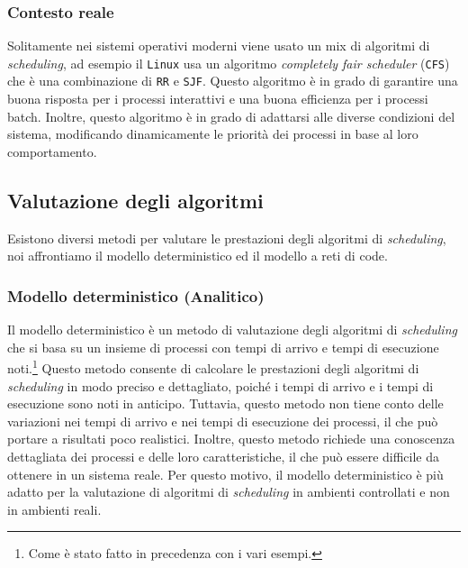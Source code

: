            \subsubsection{Contesto reale}
                Solitamente nei sistemi operativi moderni viene usato un mix di algoritmi di \textit{scheduling}, ad esempio il \texttt{Linux} usa un algoritmo \textit{completely fair scheduler} (\texttt{CFS}) che è una combinazione di \texttt{RR} e \texttt{SJF}. Questo algoritmo è in grado di garantire una buona risposta per i processi interattivi e una buona efficienza per i processi batch. Inoltre, questo algoritmo è in grado di adattarsi alle diverse condizioni del sistema, modificando dinamicamente le priorità dei processi in base al loro comportamento.
        \subsection{Valutazione degli algoritmi}
            Esistono diversi metodi per valutare le prestazioni degli algoritmi di \textit{scheduling}, noi affrontiamo il modello deterministico ed il modello a reti di code.\
            \subsubsection{Modello deterministico (Analitico)}
                Il modello deterministico è un metodo di valutazione degli algoritmi di \textit{scheduling} che si basa su un insieme di processi con tempi di arrivo e tempi di esecuzione noti.\footnote{Come è stato fatto in precedenza con i vari esempi.} Questo metodo consente di calcolare le prestazioni degli algoritmi di \textit{scheduling} in modo preciso e dettagliato, poiché i tempi di arrivo e i tempi di esecuzione sono noti in anticipo. Tuttavia, questo metodo non tiene conto delle variazioni nei tempi di arrivo e nei tempi di esecuzione dei processi, il che può portare a risultati poco realistici. Inoltre, questo metodo richiede una conoscenza dettagliata dei processi e delle loro caratteristiche, il che può essere difficile da ottenere in un sistema reale. Per questo motivo, il modello deterministico è più adatto per la valutazione di algoritmi di \textit{scheduling} in ambienti controllati e non in ambienti reali.
